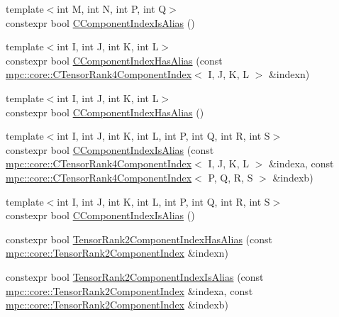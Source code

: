 \begin{DoxyCompactItemize}
{\footnotesize template$<$int M, int N, int P, int Q$>$ }\\constexpr bool \mbox{\hyperlink{namespacempc_1_1core_a27928f5f83ac3728a04d378fca923dbf}{C\+Component\+Index\+Is\+Alias}} ()
\item 
{\footnotesize template$<$int I, int J, int K, int L$>$ }\\constexpr bool \mbox{\hyperlink{namespacempc_1_1core_a2242e766ecb8a4fabbedd7284d5df21f}{C\+Component\+Index\+Has\+Alias}} (const \mbox{\hyperlink{classmpc_1_1core_1_1_c_tensor_rank4_component_index}{mpc\+::core\+::\+C\+Tensor\+Rank4\+Component\+Index}}$<$ I, J, K, L $>$ \&indexn)
\item 
{\footnotesize template$<$int I, int J, int K, int L$>$ }\\constexpr bool \mbox{\hyperlink{namespacempc_1_1core_a406506b84ea67d4832c875f28d06ac77}{C\+Component\+Index\+Has\+Alias}} ()
\item 
{\footnotesize template$<$int I, int J, int K, int L, int P, int Q, int R, int S$>$ }\\constexpr bool \mbox{\hyperlink{namespacempc_1_1core_a460c912b41c051dee4402f90e271577b}{C\+Component\+Index\+Is\+Alias}} (const \mbox{\hyperlink{classmpc_1_1core_1_1_c_tensor_rank4_component_index}{mpc\+::core\+::\+C\+Tensor\+Rank4\+Component\+Index}}$<$ I, J, K, L $>$ \&indexa, const \mbox{\hyperlink{classmpc_1_1core_1_1_c_tensor_rank4_component_index}{mpc\+::core\+::\+C\+Tensor\+Rank4\+Component\+Index}}$<$ P, Q, R, S $>$ \&indexb)
\item 
{\footnotesize template$<$int I, int J, int K, int L, int P, int Q, int R, int S$>$ }\\constexpr bool \mbox{\hyperlink{namespacempc_1_1core_aa712fe25e927caf0d63c2eb2673cd088}{C\+Component\+Index\+Is\+Alias}} ()
\item 
constexpr bool \mbox{\hyperlink{namespacempc_1_1core_a1773ac71ac76281f15a14fbc2590c4da}{Tensor\+Rank2\+Component\+Index\+Has\+Alias}} (const \mbox{\hyperlink{namespacempc_1_1core_a7ae080dac58868c1e167479dce34928a}{mpc\+::core\+::\+Tensor\+Rank2\+Component\+Index}} \&indexn)
\item 
constexpr bool \mbox{\hyperlink{namespacempc_1_1core_a4968c91b710a9f3384869b2de32dd7de}{Tensor\+Rank2\+Component\+Index\+Is\+Alias}} (const \mbox{\hyperlink{namespacempc_1_1core_a7ae080dac58868c1e167479dce34928a}{mpc\+::core\+::\+Tensor\+Rank2\+Component\+Index}} \&indexa, const \mbox{\hyperlink{namespacempc_1_1core_a7ae080dac58868c1e167479dce34928a}{mpc\+::core\+::\+Tensor\+Rank2\+Component\+Index}} \&indexb)

\end{DoxyCompactItemize}
